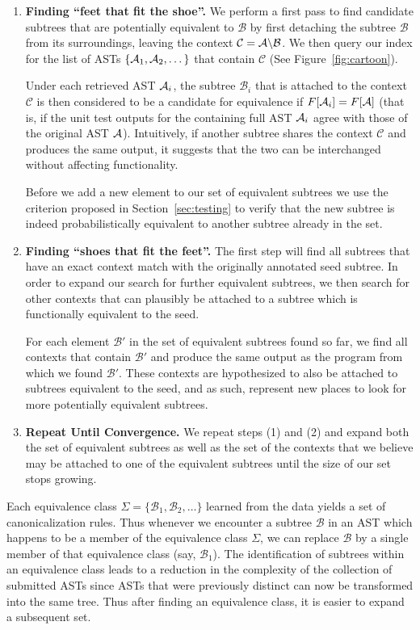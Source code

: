 \begin{enumerate}
\item {\bf Finding ``feet that fit the shoe''.}
 We perform a first pass to find candidate subtrees that are potentially equivalent to $\mathcal{B}$
by first detaching the subtree $\mathcal{B}$ from its surroundings, leaving the context $\mathcal{C} = \mathcal{A}\backslash\mathcal{B}$.
We then query our index for the list of ASTs $\{\mathcal{A}_1,\mathcal{A}_2,\dots\}$ that contain $\mathcal{C}$ (See Figure~\ref{fig:cartoon}).

Under each retrieved AST $\mathcal{A}_i$, the subtree $\mathcal{B}_i$ that is attached to the context $\mathcal{C}$ is
then considered to be a candidate for equivalence if $F[\mathcal{A}_i] = F[\mathcal{A}]$ (that is, if
the unit test outputs for the containing full AST $\mathcal{A}_i$ agree with those of the original AST $\mathcal{A}$). Intuitively, if another subtree shares the context $\mathcal{C}$ and 
produces the same output, it suggests that the two can be interchanged without affecting  functionality.

Before we add a new element to our set of equivalent subtrees 
we use the criterion proposed in Section~\ref{sec:testing} to verify that the new subtree is indeed
probabilistically equivalent to another subtree already in the set.
\item {\bf Finding ``shoes that fit the feet''.}
The first step will find all subtrees that have an exact context match with the originally annotated seed subtree. In order to expand our search for further equivalent subtrees, 
we then search for other contexts that can plausibly be attached to a subtree which is functionally equivalent to the seed. 

For each element $\mathcal{B}'$ in the set of equivalent subtrees found so far, we find all 
contexts that contain  $\mathcal{B}'$ and produce the same output as the program from 
which we found $\mathcal{B}'$. These contexts are hypothesized to also be attached to subtrees equivalent to the seed, 
and as such, represent new places to look for more potentially equivalent subtrees.
 
\item {\bf Repeat Until Convergence.}
We repeat steps (1) and (2) and expand both the set of equivalent subtrees as well as the
set of the contexts that we believe may be attached to one of the equivalent subtrees 
until the size of our set stops growing.
\end{enumerate}

Each equivalence class
$\Sigma=\{\mathcal{B}_1,\mathcal{B}_2,\dots\}$ 
learned from the data yields a set of canonicalization rules.  Thus whenever
we encounter a subtree $\mathcal{B}$ in an AST which happens to be a member of the equivalence class
$\Sigma$, we can replace $\mathcal{B}$ by a single member of that equivalence class (say, $\mathcal{B}_1$).
The identification of subtrees within an equivalence class
 leads to a reduction in the complexity of the collection of submitted ASTs since ASTs that were previously
distinct can now be transformed into the same tree.  Thus after finding an equivalence class, it is easier to expand a subsequent set.



